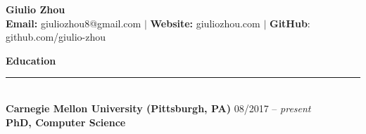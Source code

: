 \documentclass{article}
\begin{document}
\newcommand{\HRule}{\rule{\linewidth}{0.2mm}}


\begin{center}
\textbf{{\LARGE Giulio Zhou}} \\ 
\textbf{\fontsize{11}{13.2} Email:} giuliozhou8@gmail.com  $|$ \textbf{Website:} giuliozhou.com $|$ \textbf{GitHub}: github.com/giulio-zhou\\[2mm]
\end{center}


\normalsize
\noindent
\textbf{{\Large Education}}\\[-2mm]
\HRule\\
\textbf{Carnegie Mellon University (Pittsburgh, PA)}
\hfill 08/2017 -- \textit{present} \\
\indent
\textbf{PhD, Computer Science}
\vspace{1mm}
\end{document}
